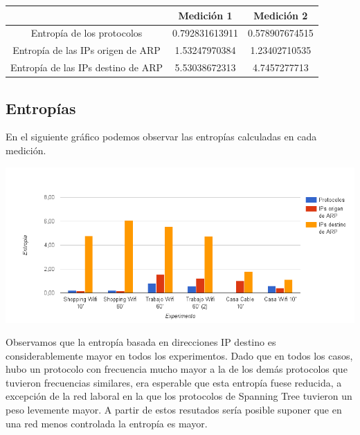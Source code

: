 \begin{center}
\begin{tabular}{|c||c|c|}
\hline
 & Medición 1 & Medición 2 \\
\hline
\hline
Entropía de los protocolos & 0.792831613911 & 0.578907674515 \\
\hline
Entropía de las IPs origen de ARP & 1.53247970384 & 1.23402710535 \\
\hline
Entropía de las IPs destino de ARP & 5.53038672313 & 4.7457277713 \\
\hline
\end{tabular}
\end{center}

\subsection{Entropías}

En el siguiente gráfico podemos observar las entropías calculadas en cada medición.

\begin{center}
\includegraphics[width=14cm]{../mediciones/entropias.png}
\end{center}

Observamos que la entropía basada en direcciones IP destino es considerablemente mayor en todos los experimentos.
Dado que en todos los casos, hubo un protocolo con frecuencia mucho mayor a la de los demás protocolos que tuvieron
frecuencias similares, era esperable que esta entropía fuese reducida, a excepción de la red laboral en la que los
protocolos de Spanning Tree tuvieron un peso levemente mayor. A partir de estos resutados sería posible suponer
que en una red menos controlada la entropía es mayor.
